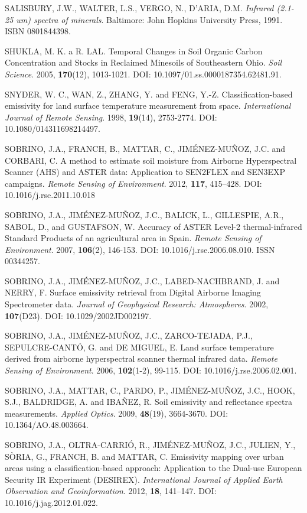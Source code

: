 \begin{thebibliography}{10}
 SALISBURY, J.W., WALTER, L.S., VERGO, N., D'ARIA, D.M. \textit{Infrared (2.1-25 um) spectra of minerals}. Baltimore: John Hopkins University Press, 1991. ISBN 0801844398.

 SHUKLA, M. K. a R. LAL. Temporal Changes in Soil Organic Carbon Concentration and Stocks in Reclaimed Minesoils of Southeastern Ohio. \textit{Soil Science}. 2005, \textbf{170}(12), 1013-1021. DOI: 10.1097/01.ss.0000187354.62481.91.

 SNYDER, W. C., WAN, Z., ZHANG, Y. and FENG, Y.-Z. Classification-based emissivity for land surface temperature measurement from space. \textit{International Journal of Remote Sensing}. 1998, \textbf{19}(14), 2753-2774. DOI: 10.1080/014311698214497.

 SOBRINO, J.A., FRANCH, B., MATTAR, C., JIMÉNEZ-MUÑOZ, J.C. and CORBARI, C. A method to estimate soil moisture from Airborne Hyperspectral Scanner (AHS) and ASTER data: Application to SEN2FLEX and SEN3EXP campaigns. \textit{Remote Sensing of Environment}. 2012, \textbf{117}, 415–428. DOI: 10.1016/j.rse.2011.10.018

 SOBRINO, J.A., JIMÉNEZ-MUÑOZ, J.C., BALICK, L., GILLESPIE, A.R., SABOL, D., and GUSTAFSON, W. Accuracy of ASTER Level-2 thermal-infrared Standard Products of an agricultural area in Spain. \textit{Remote Sensing of Environment}. 2007, \textbf{106}(2), 146-153. DOI: 10.1016/j.rse.2006.08.010. ISSN 00344257.

 SOBRINO, J.A., JIMÉNEZ-MUÑOZ, J.C., LABED-NACHBRAND, J. and NERRY, F. Surface emissivity retrieval from Digital Airborne Imaging Spectrometer data. \textit{Journal of Geophysical Research: Atmospheres}. 2002, \textbf{107}(D23). DOI: 10.1029/2002JD002197.

 SOBRINO, J.A., JIMÉNEZ-MUÑOZ, J.C., ZARCO-TEJADA, P.J., SEPULCRE-CANTÓ, G. and DE MIGUEL, E. Land surface temperature derived from airborne hyperspectral scanner thermal infrared data. \textit{Remote Sensing of Environment}. 2006, \textbf{102}(1-2), 99-115. DOI: 10.1016/j.rse.2006.02.001.

 SOBRINO, J.A., MATTAR, C., PARDO, P., JIMÉNEZ-MUÑOZ, J.C., HOOK, S.J., BALDRIDGE, A. and IBAÑEZ, R. Soil emissivity and reflectance spectra measurements. \textit{Applied Optics}. 2009, \textbf{48}(19), 3664-3670. DOI: 10.1364/AO.48.003664.

 SOBRINO, J.A., OLTRA-CARRIÓ, R., JIMÉNEZ-MUÑOZ, J.C., JULIEN, Y., SÒRIA, G., FRANCH, B. and MATTAR, C. Emissivity mapping over urban areas using a classification-based approach: Application to the Dual-use European Security IR Experiment (DESIREX). \textit{International Journal of Applied Earth Observation and Geoinformation}. 2012, \textbf{18}, 141–147. DOI: 10.1016/j.jag.2012.01.022.


\end{thebibliography}
